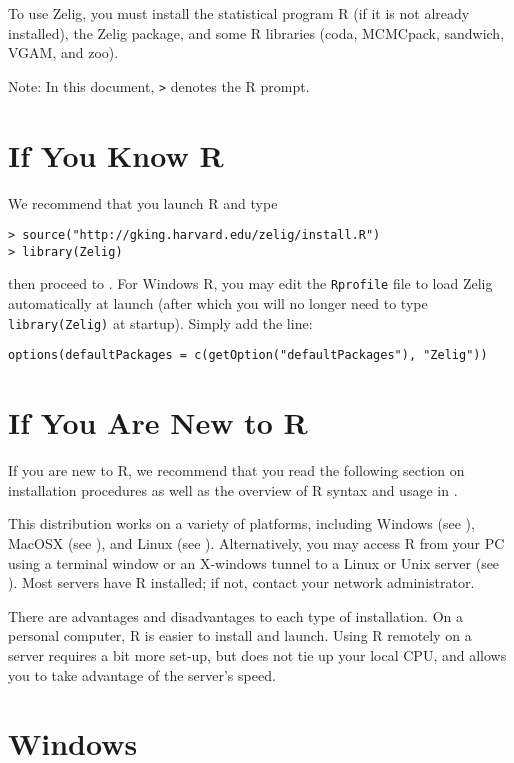\documentclass{article}
\begin{document}
To use Zelig, you must install the statistical program R (if it is not
already installed), the Zelig package, and some R libraries (coda,
MCMCpack, sandwich, VGAM, and zoo).  

Note: In this document, {\tt >} denotes the R prompt.  

\section{If You Know R} 

We recommend that you launch R and type 
\begin{verbatim}
> source("http://gking.harvard.edu/zelig/install.R")
> library(Zelig)
\end{verbatim}
then proceed to .  For Windows R, you may edit the 
{\tt Rprofile} file to load Zelig automatically at launch (after which you
will no longer need to type {\tt library(Zelig)} at startup).  Simply
add the line:
\begin{verbatim}
options(defaultPackages = c(getOption("defaultPackages"), "Zelig"))
\end{verbatim}

\section{If You Are New to R}

If you are new to R, we recommend that you read the following section
on installation procedures as well as the overview of R syntax and
usage in .

This distribution works on a variety of platforms, including Windows
(see ), MacOSX (see ), and Linux (see
).  Alternatively, you may access R from your PC using a
terminal window or an X-windows tunnel to a Linux or Unix server (see
).  Most servers have R installed; if not, contact your
network administrator.

There are advantages and disadvantages to each type of installation.
On a personal computer, R is easier to install and launch.  Using R
remotely on a server requires a bit more set-up, but does not tie up
your local CPU, and allows you to take advantage of the server's speed.

\section{Windows}\label{ss:win}
\end{document}

